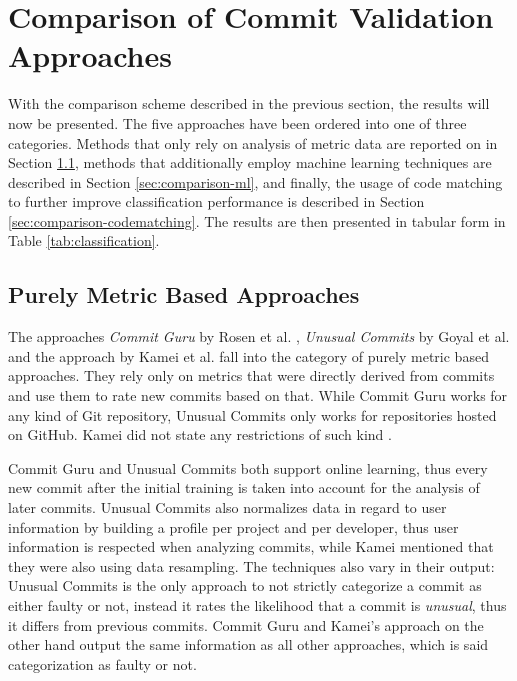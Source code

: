 \section{Comparison of Commit Validation Approaches}
\label{sec:comparison}

With the comparison scheme described in the previous section,
the results will now be presented. 
The five approaches have been ordered into one of three categories. Methods that only rely on analysis of metric data are reported on in Section \ref{sec:comparison-metricbased}, methods that additionally employ machine learning techniques are described in Section \ref{sec:comparison-ml}, and finally, the usage of code matching to further improve classification performance is described in Section \ref{sec:comparison-codematching}.
The results are then presented in tabular form in Table \ref{tab:classification}.

\subsection{Purely Metric Based Approaches}
\label{sec:comparison-metricbased}

The approaches \textit{Commit Guru} by Rosen et al. \cite{Rosen2015}, \textit{Unusual Commits} by Goyal et al. \cite{Goyal2017} and the approach by Kamei et al. \cite{Kamei2013} fall into the category of purely metric based approaches. They rely only on metrics that were directly derived from commits and use them to rate new commits based on that. While Commit Guru works for any kind of Git repository, Unusual Commits only works for repositories hosted on GitHub. Kamei did not state any restrictions of such kind \cite{Kamei2013}.

Commit Guru and Unusual Commits both support online learning, thus every new commit after the initial training is taken into account for the analysis of later commits.
Unusual Commits also normalizes data in regard to user information by building a profile per project and per developer, thus user information is respected when analyzing commits, 
while Kamei mentioned that they were also using data resampling.
The techniques also vary in their output: Unusual Commits is the only approach to not strictly categorize a commit as either faulty or not, instead it rates the likelihood that a commit is \textit{unusual}, thus it differs from previous commits.
Commit Guru and Kamei's approach on the other hand output the same information as all other approaches, which is said categorization as faulty or not.


